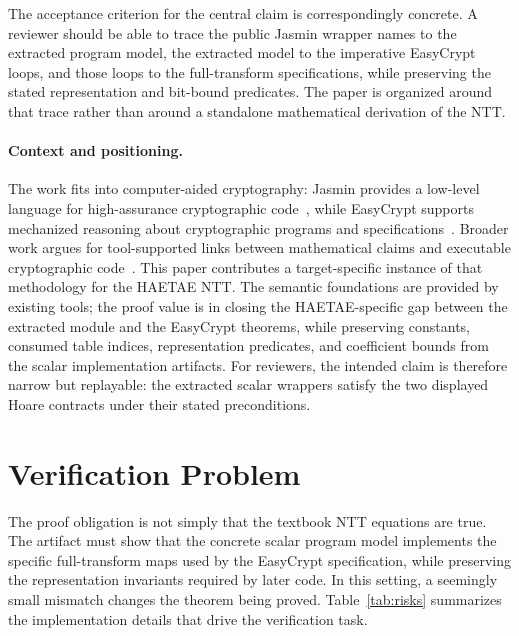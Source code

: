 \documentclass[10pt,twocolumn]{article}
\newcommand{\haetae}{HAETAE}
\newcommand{\ec}{EasyCrypt}
\newcommand{\jasmin}{Jasmin}
\begin{document}
The acceptance criterion for the central claim is correspondingly concrete. A
reviewer should be able to trace the public \jasmin{} wrapper names to the
extracted program model, the extracted model to the imperative \ec{}
loops, and those loops to the full-transform specifications, while preserving
the stated representation and bit-bound predicates. The paper is organized
around that trace rather than around a standalone mathematical derivation of the
NTT.

\paragraph{Context and positioning.}
The work fits into computer-aided cryptography: \jasmin{} provides a low-level
language for high-assurance cryptographic code~\cite{Jasmin2017}, while
\ec{} supports mechanized reasoning about cryptographic programs and
specifications~\cite{EasyCrypt2013}. Broader work argues for tool-supported
links between mathematical claims and executable cryptographic
code~\cite{ComputerAidedCrypto2021}. This paper contributes a target-specific
instance of that methodology for the \haetae{} NTT. The semantic foundations are
provided by existing tools; the proof value is in closing the HAETAE-specific
gap between the extracted module and the EasyCrypt theorems, while
preserving constants, consumed table indices, representation predicates, and
coefficient bounds from the scalar implementation artifacts. For reviewers, the
intended claim is therefore narrow but
replayable: the extracted scalar wrappers satisfy the two displayed Hoare
contracts under their stated preconditions.

\section{Verification Problem}

The proof obligation is not simply that the textbook NTT equations are true.
The artifact must show that the concrete scalar program model implements the
specific full-transform maps used by the \ec{} specification, while preserving
the representation invariants required by later code. In this setting, a
seemingly small mismatch changes the theorem being proved. Table~\ref{tab:risks}
summarizes the implementation details that drive the verification task.
\end{document}
